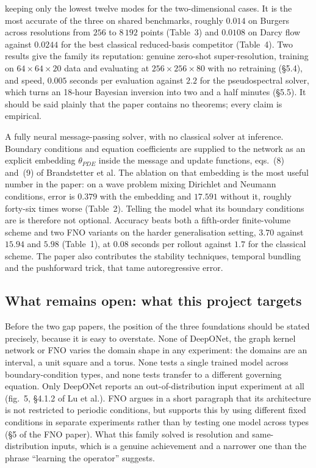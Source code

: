 \documentclass[11pt, a4paper]{article}
\begin{document}
\begin{description}[style=nextline]
  keeping only the lowest twelve modes for the two-dimensional cases. It is
  the most accurate of the three on shared benchmarks, roughly $0.014$ on
  Burgers across resolutions from $256$ to $8\,192$ points (Table~3) and
  $0.0108$ on Darcy flow against $0.0244$ for the best classical reduced-basis
  competitor (Table~4). Two results give the family its reputation: genuine
  zero-shot super-resolution, training on $64\times64\times20$ data and
  evaluating at $256\times256\times80$ with no retraining (\S{}5.4), and speed,
  $0.005$ seconds per evaluation against $2.2$ for the pseudospectral solver,
  which turns an 18-hour Bayesian inversion into two and a half minutes
  (\S{}5.5). It should be said plainly that the paper contains no theorems; every
  claim is empirical.
  \item[Brandstetter, Worrall and Welling~\citep{brandstetter}]
  A fully neural message-passing solver, with no classical solver at
  inference. Boundary conditions and equation coefficients are supplied to the
  network as an explicit embedding $\theta_{PDE}$ inside the message and
  update functions, eqs.~(8) and~(9) of Brandstetter et al. The ablation on
  that embedding is the most useful number in the paper: on a wave problem
  mixing Dirichlet and Neumann conditions, error is $0.379$ with the
  embedding and $17.591$ without it, roughly forty-six times worse (Table~2).
  Telling the model what its boundary conditions are is therefore not
  optional. Accuracy beats both a fifth-order finite-volume scheme and two FNO
  variants on the harder generalisation setting, $3.70$ against $15.94$ and
  $5.98$ (Table~1), at $0.08$ seconds per rollout against $1.7$ for the
  classical scheme. The paper also contributes the stability techniques,
  temporal bundling and the pushforward trick, that tame autoregressive error.
\end{description}

\subsection{What remains open: what this project targets}

Before the two gap papers, the position of the three foundations should be
stated precisely, because it is easy to overstate. None of DeepONet, the graph
kernel network or FNO varies the domain shape in any experiment: the domains
are an interval, a unit square and a torus. None tests a single trained model
across boundary-condition types, and none tests transfer to a different
governing equation. Only DeepONet reports an out-of-distribution input
experiment at all (fig.~5, \S{}4.1.2 of Lu et al.). FNO argues in a short
paragraph that its architecture is not restricted to periodic conditions, but
supports this by using different fixed conditions in separate experiments
rather than by testing one model across types (\S{}5 of the FNO paper). What this
family solved is resolution and same-distribution inputs, which is a genuine
achievement and a narrower one than the phrase ``learning the operator''
suggests.
\end{document}
